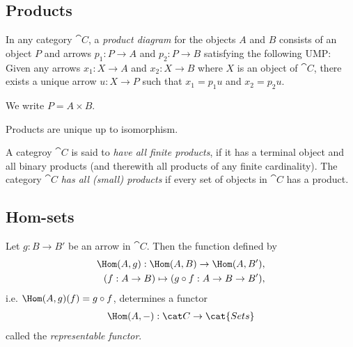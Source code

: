 \documentclass{article}
\begin{document}
\subsection{Products}

\begin{definition}
    In any category $\cat C$, a \emph{product diagram} for the objects $A$
    and $B$ consists of an object $P$ and arrows $p_1:P\to A$ and $p_2:P\to B$
    satisfying the following UMP: Given any arrows $x_1:X\to A$ and $x_2:X\to B$
    where $X$ is an object of $\cat C$, there exists a unique arrow $u:X\to P$
    such that $x_1=p_1u$ and $x_2=p_2u$.
    \begin{center}
    \end{center}
    We write $P=A\times B$.
\end{definition}

\begin{theorem}[Awodey 2.17]
    Products are unique up to isomorphism.
\end{theorem}

\begin{definition}[Awodey 2.19]
    A categroy $\cat C$ is said to \emph{have all finite products}, if it has a
    terminal object and all binary products (and therewith all products of any
    finite cardinality). The category $\cat C$ \emph{has all (small) products}
    if every set of objects in $\cat C$ has a product.
\end{definition}

\subsection{Hom-sets}

\begin{theorem}
    Let $g:B\to B'$ be an arrow in $\cat C$. Then the function
    defined by
    \begin{align*}
        \Hom(A, g):\Hom(A,B)\to\Hom(A,B'), \\
        (f:A\to B) \mapsto (g\circ f:A\to B\to B'),
    \end{align*}
    i.e. $\Hom(A,g)(f)=g\circ f$, determines a functor
    \begin{align*}
        \Hom(A,-):\cat C \to \cat{Sets}
    \end{align*}
    called the \emph{representable functor}.
\end{theorem}
\end{document}
